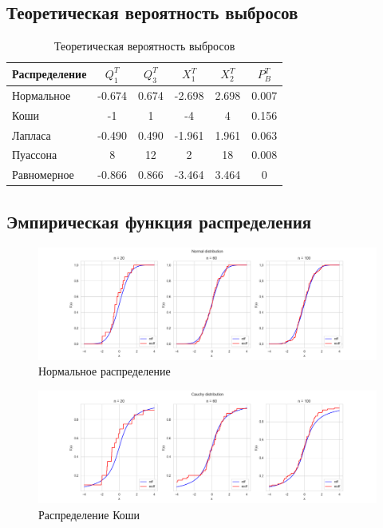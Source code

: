 \documentclass[a4paper,14pt]{article}
\begin{document}
	\subsection{Теоретическая вероятность выбросов}
	\begin{table}[H]
		\centering
		\begin{tabular}{|l|c|c|c|c|c|}
			\hline
			Распределение & $Q_1^T$	& $Q_3^T$ & $X_1^T$ & $X_2^T$ & $P_B^T$\\\hline
			\hline
			Нормальное & -0.674 & 0.674 & -2.698 &  2.698 & 0.007\\\hline
			Коши & -1 & 1 & -4 & 4 & 0.156\\\hline
			Лапласа & -0.490 & 0.490 & -1.961 & 1.961 & 0.063\\\hline
			Пуассона & 8 & 12 & 2 & 18 & 0.008\\\hline
			Равномерное & -0.866 & 0.866 & -3.464 & 3.464 & 0\\\hline
		\end{tabular}
		\caption{Теоретическая вероятность выбросов}
	\end{table}
	
	\subsection{Эмпирическая функция распределения}
	\begin{figure}[H]
		\centering
		\includegraphics[scale=0.35]{../image/lab4/lab4_ecdf_norm.png}
		\caption{Нормальное распределение}
	\end{figure}
	
	\begin{figure}[H]
		\centering
		\includegraphics[scale=0.35]{../image/lab4/lab4_ecdf_cauchy.png}
		\caption{Распределение Коши}
	\end{figure}
	
\end{document}
